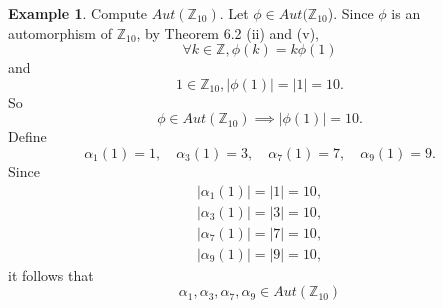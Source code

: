 \documentclass{article}
\theoremstyle{definition}
\newtheorem{example}{Example}[section]
\begin{document}
 \begin{example}
     Compute $Aut(\mathbb{Z}_{10})$. Let $\phi \in Aut(\mathbb{Z}_{10}$). Since $\phi$ is an automorphism of $\mathbb{Z}_{10}$, by Theorem 6.2 (ii) and (v),
     \begin{equation*}
        \forall k \in \mathbb{Z}, \phi(k) = k\phi(1)
     \end{equation*}
     and
     \begin{equation*}
         1 \in \mathbb{Z}_{10}, |\phi(1)| = |1| = 10.
     \end{equation*}
     So 
     \begin{equation*}
         \phi \in Aut(\mathbb{Z}_{10}) \implies |\phi(1)| = 10.
     \end{equation*}
     Define
     \begin{equation*}
         \alpha_1(1)=1, \quad \alpha_3(1)=3, \quad \alpha_7(1)=7, \quad \alpha_9(1)=9.
     \end{equation*}
     Since 
     \begin{align*}
         |\alpha_1(1)| = |1| = 10, \\
         |\alpha_3(1)| = |3| = 10, \\
         |\alpha_7(1)| = |7| = 10, \\
         |\alpha_9(1)| = |9| = 10,
     \end{align*}
     it follows that
     \begin{equation*}
         \alpha_1,\alpha_3,\alpha_7,\alpha_9 \in Aut(\mathbb{Z}_{10})
     \end{equation*}
     

\end{example}
\end{document}
